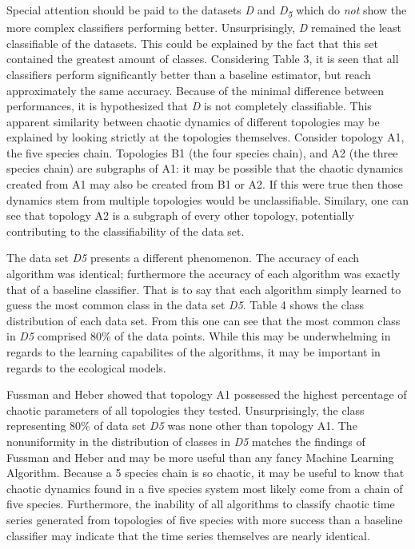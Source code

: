 \documentclass[letterpaper, 10 pt, conference]{ieeeconf}  %
\begin{document}
		Special attention should be paid to the datasets \textit{D} and \textit{D\textsubscript{5}} which do \textit{not} show the more complex classifiers performing better. Unsurprisingly, \textit{D} remained the least classifiable of the datasets. This could be explained by the fact that this set contained the greatest amount of classes. Considering Table 3, it is seen that all classifiers perform significantly better than a baseline estimator, but reach approximately the same accuracy. Because of the minimal difference between performances, it is hypothesized that \textit{D} is not completely classifiable. This apparent similarity between chaotic dynamics of different topologies may be explained by looking strictly at the topologies themselves. Consider topology A1, the five species chain. Topologies B1 (the four species chain), and A2 (the three species chain) are subgraphs of A1: it may be possible that the chaotic dynamics created from A1 may also be created from B1 or A2. If this were true then those dynamics stem from multiple topologies would be unclassifiable. Similary, one can see that topology A2 is a subgraph of every other topology, potentially contributing to the classifiability of the data set. 
        
        The data set \textit{D\textit{5}} presents a different phenomenon. The accuracy of each algorithm was identical; furthermore the accuracy of each algorithm was exactly that of a baseline classifier. That is to say that each algorithm simply learned to guess the most common class in the data set \textit{D\textit{5}}. Table 4 shows the class distribution of each data set. From this one can see that the most common class in \textit{D\textit{5}} comprised 80\% of the data points. While this may be underwhelming in regards to the learning capabilites of the algorithms, it may be important in regards to the ecological models.  
        
        Fussman and Heber showed that topology A1 possessed the highest percentage of chaotic parameters of all topologies they tested. Unsurprisingly, the class representing 80\% of data set \textit{D\textit{5}} was none other than topology A1. The nonuniformity in the distribution of classes in \textit{D\textit{5}} matches the findings of Fussman and Heber and may be more useful than any fancy Machine Learning Algorithm. Because a 5 species chain is so chaotic, it may be useful to know that chaotic dynamics found in a five species system most likely come from a chain of five species. Furthermore, the inability of all algorithms to classify chaotic time series generated from topologies of five species with more success than a baseline classifier may indicate that the time series themselves are nearly identical. 
        
\end{document}
